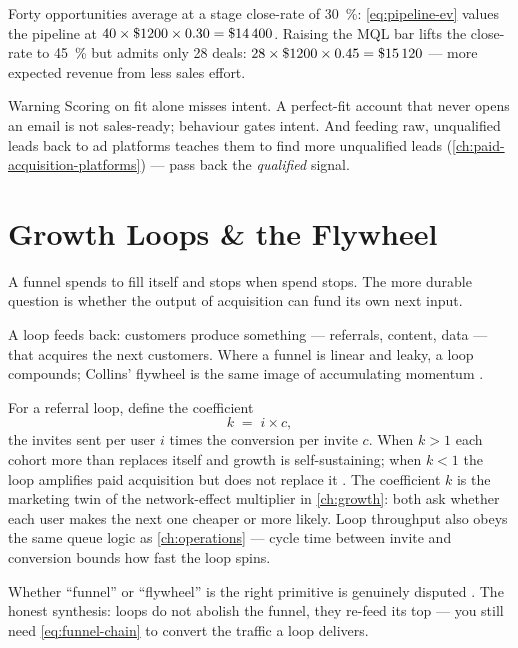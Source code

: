 \begin{example}
Forty opportunities average  at a stage close-rate of \qty{30}{\percent}: \cref{eq:pipeline-ev} values the pipeline at $40\times\$\num{1200}\times0.30=\$\num{14400}$. Raising the MQL bar lifts the close-rate to \qty{45}{\percent} but admits only \num{28} deals: $28\times\$\num{1200}\times0.45=\$\num{15120}$ --- more expected revenue from less sales effort.
\end{example}

\begin{admonition}{Warning}
Scoring on fit alone misses intent. A perfect-fit account that never opens an email is not sales-ready; behaviour gates intent. And feeding raw, unqualified leads back to ad platforms teaches them to find more unqualified leads (\cref{ch:paid-acquisition-platforms}) --- pass back the \emph{qualified} signal.
\end{admonition}

\section{Growth Loops \& the Flywheel}\label{sec:growth-loops}

A funnel spends to fill itself and stops when spend stops. The more durable question is whether the output of acquisition can fund its own next input.

A loop feeds back: customers produce something --- referrals, content, data --- that acquires the next customers. Where a funnel is linear and leaky, a loop compounds; Collins' flywheel is the same image of accumulating momentum \parencite{collins2001good,ellis2017hacking}.

For a referral loop, define the coefficient
\begin{equation}\label{eq:viral-k}
  k \;=\; i \times c,
\end{equation}
the invites sent per user $i$ times the conversion per invite $c$. When $k>1$ each cohort more than replaces itself and growth is self-sustaining; when $k<1$ the loop amplifies paid acquisition but does not replace it \parencite{leskovec2007dynamics}. The coefficient $k$ is the marketing twin of the network-effect multiplier in \cref{ch:growth}: both ask whether each user makes the next one cheaper or more likely. Loop throughput also obeys the same queue logic as \cref{ch:operations} --- cycle time between invite and conversion bounds how fast the loop spins.

Whether ``funnel'' or ``flywheel'' is the right primitive is genuinely disputed \parencite{meyer2019marketing,vazirani2023flywheel}. The honest synthesis: loops do not abolish the funnel, they re-feed its top --- you still need \cref{eq:funnel-chain} to convert the traffic a loop delivers.

